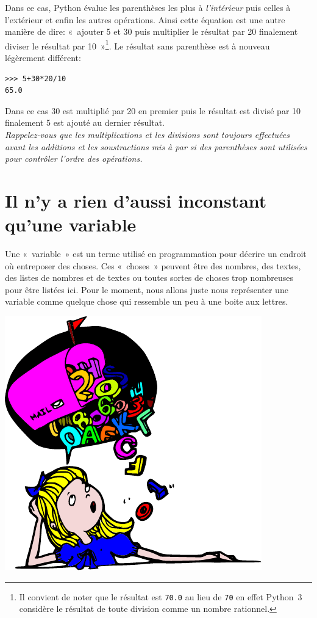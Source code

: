 Dans ce cas, Python évalue les parenthèses les plus à \emph{l'intérieur} puis celles à l'extérieur et enfin les autres opérations. Ainsi cette équation est une autre manière de dire: «~ajouter 5 et 30 puis multiplier le résultat par 20 finalement diviser le résultat par 10~»\footnote{Il convient de noter que le résultat est \texttt{70.0} au lieu de \texttt{70} en effet Python~3 considère le résultat de toute division comme un nombre rationnel.}. Le résultat sans parenthèse est à nouveau légèrement différent: 

\begin{Verbatim}[frame=single,rulecolor=\color{mbleu}, label=à taper]
>>> 5+30*20/10
65.0
\end{Verbatim}

Dans ce cas 30 est multiplié par 20 en premier puis le résultat est divisé par 10 finalement 5 est ajouté au dernier résultat.\\


\emph{Rappelez-vous que les multiplications et les divisions sont toujours effectuées avant les additions et les soustractions mis à par si des parenthèses sont utilisées pour contrôler l'ordre des opérations.}


\section{Il n'y a rien d'aussi inconstant qu'une variable}

Une «~variable~» est un terme utilisé en programmation pour décrire un endroit où entreposer des choses. Ces «~choses~» peuvent être des nombres, des textes, des listes de nombres et de textes ou toutes sortes de choses trop nombreuses pour être listées ici. Pour le moment, nous allons juste nous représenter une variable comme quelque chose qui ressemble un peu à une boite aux lettres.

\begin{center}
\includegraphics[scale=1]{images/boite.pdf} 
\end{center}

